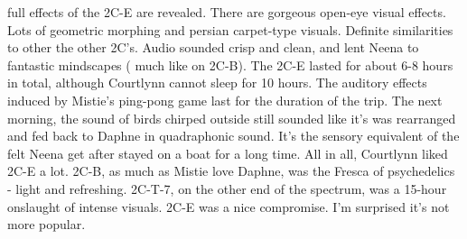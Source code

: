 \documentclass[12pt]{book}
\begin{document}
full effects of the 2C-E are revealed. There are gorgeous open-eye visual effects. Lots of geometric morphing and persian carpet-type visuals. Definite similarities to other the other 2C's. Audio sounded crisp and clean, and lent Neena to fantastic mindscapes ( much like on 2C-B). The 2C-E lasted for about 6-8 hours in total, although Courtlynn cannot sleep for 10 hours. The auditory effects induced by Mistie's ping-pong game last for the duration of the trip. The next morning, the sound of birds chirped outside still sounded like it's was rearranged and fed back to Daphne in quadraphonic sound. It's the sensory equivalent of the felt Neena get after stayed on a boat for a long time. All in all, Courtlynn liked 2C-E a lot. 2C-B, as much as Mistie love Daphne, was the Fresca of psychedelics - light and refreshing. 2C-T-7, on the other end of the spectrum, was a 15-hour onslaught of intense visuals. 2C-E was a nice compromise. I'm surprised it's not more popular.
\end{document}
